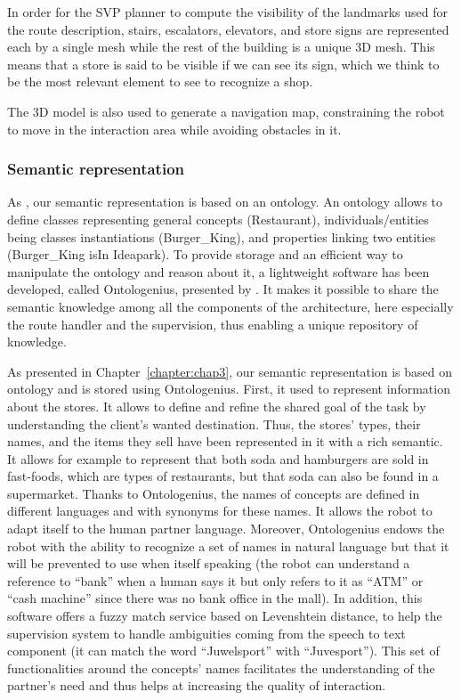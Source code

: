 \documentclass[a4paper,11pt,twoside]{StyleThese}
\begin{document}
In order for the SVP planner to compute the visibility of the landmarks used for the route description, stairs, escalators, elevators, and store signs are represented each by a single mesh while the rest of the building is a unique 3D mesh. This means that a store is said to be visible if we can see its sign, which we think to be the most relevant element to see to recognize a shop.

The 3D model is also used to generate a navigation map, constraining the robot to move in the interaction area while avoiding obstacles in it.

\subsubsection{Semantic representation}\label{subsubsec:semantic}

As \cite{satake_2015_field}, our semantic representation is based on an ontology. An ontology allows to define classes representing general concepts (\eg Restaurant), individuals/entities being classes instantiations (\eg Burger\_King), and properties linking two entities (\eg Burger\_King isIn Ideapark).
To provide storage and an efficient way to manipulate the ontology and reason about it, a lightweight software has been developed, called Ontologenius, presented by \cite{sarthou_2019_ontologenius}. It makes it possible to share the semantic knowledge among all the components of the architecture, here especially the route handler and the supervision, thus enabling a unique repository of knowledge.

As presented in Chapter~\ref{chapter:chap3}, our semantic representation is based on ontology and is stored using Ontologenius. First, it used to represent information about the stores. It allows to define and refine the shared goal of the task by understanding the client's wanted destination. Thus, the stores' types, their names, and the items they sell have been represented in it with a rich semantic. It allows for example to represent that both soda and hamburgers are sold in fast-foods, which are types of restaurants, but that soda can also be found in a supermarket. Thanks to Ontologenius, the names of concepts are defined in different languages and with synonyms for these names. It allows the robot to adapt itself to the human partner language. Moreover, Ontologenius endows the robot with the ability to recognize a set of names in natural language but that it will be prevented to use when itself speaking (\eg the robot can understand a reference to ``bank'' when a human says it but only refers to it as ``ATM'' or ``cash machine'' since there was no bank office in the mall). In addition, this software offers a fuzzy match service based on Levenshtein distance, to help the supervision system to handle ambiguities coming from the speech to text component (\eg it can match the word ``Juwelsport'' with ``Juvesport''). This set of functionalities around the concepts' names facilitates the understanding of the partner's need and thus helps at increasing the quality of interaction.
\end{document}
